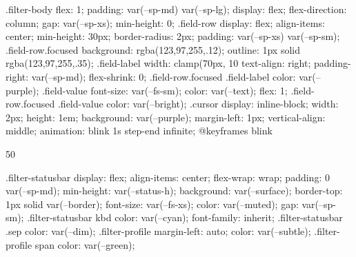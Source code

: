 {.filter-body {
  flex: 1; padding: var(--sp-md) var(--sp-lg);
  display: flex; flex-direction: column; gap: var(--sp-xs); min-height: 0;
}
.field-row {
  display: flex; align-items: center;
  min-height: 30px; border-radius: 2px; padding: var(--sp-xs) var(--sp-sm);
}
.field-row.focused { background: rgba(123,97,255,.12); outline: 1px solid rgba(123,97,255,.35); }
.field-label {
  width: clamp(70px, 10%
  text-align: right; padding-right: var(--sp-md); flex-shrink: 0;
}
.field-row.focused .field-label { color: var(--purple); }
.field-value { font-size: var(--fs-sm); color: var(--text); flex: 1; }
.field-row.focused .field-value { color: var(--bright); }
.cursor {
  display: inline-block; width: 2px; height: 1em;
  background: var(--purple); margin-left: 1px; vertical-align: middle;
  animation: blink 1s step-end infinite;
}
@keyframes blink { 50%

.filter-statusbar {
  display: flex; align-items: center; flex-wrap: wrap;
  padding: 0 var(--sp-md); min-height: var(--status-h);
  background: var(--surface); border-top: 1px solid var(--border);
  font-size: var(--fs-xs); color: var(--muted); gap: var(--sp-sm);
}
.filter-statusbar kbd { color: var(--cyan); font-family: inherit; }
.filter-statusbar .sep { color: var(--dim); }
.filter-profile { margin-left: auto; color: var(--subtle); }
.filter-profile span { color: var(--green); }

}}
